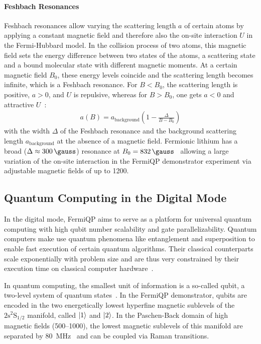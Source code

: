 \paragraph*{Feshbach Resonances} Feshbach resonances allow varying the scattering length $a$ of certain atoms by applying a constant magnetic field and therefore also the on-site interaction $U$ in the Fermi-Hubbard model. In the collision process of two atoms, this magnetic field sets the energy difference between two states of the atoms, a scattering state and a bound molecular state with different magnetic moments. At a certain magnetic field $B_0$, these energy levels coincide and the scattering length becomes infinite, which is a Feshbach resonance. For $B < B_0$, the scattering length is positive, $a > 0$, and $U$ is repulsive, whereas for $B > B_0$, one gets $a < 0$ and attractive $U$~\cite{chin_feshbach_2010}:
\begin{align}
    a(B) = a_\text{background} \left(1 - \frac{\Delta}{B-B_0}\right)
\end{align}
with the width $\Delta$ of the Feshbach resonance and the background scattering length $a_\text{background}$ at the absence of a magnetic field. Fermionic lithium has a broad ($\Delta \approx \SI[]{300}{\gauss}$) resonance at $B_0 = \SI[]{832}{\gauss}$~\cite{zurn_precise_2013} allowing a large variation of the on-site interaction in the FermiQP demonstrator experiment via adjustable magnetic fields of up to \SI[]{1200}{\gauss}.

\subsection*{Quantum Computing in the Digital Mode}\label{ch:digital_mode}
In the digital mode, FermiQP aims to serve as a platform for universal quantum computing with high qubit number scalability and gate parallelizability. Quantum computers make use quantum phenomena like entanglement and superposition to enable fast execution of certain quantum algorithms. Their classical counterparts scale exponentially with problem size and are thus very constrained by their execution time on classical computer hardware~\cite{nielsen_quantum_2010, hidary_quantum_2021, ladd_quantum_2010, mainzer_quantencomputer_2020}.

In quantum computing, the smallest unit of information is a so-called qubit, a two-level system of quantum states~\cite{nielsen_quantum_2010, hidary_quantum_2021, ladd_quantum_2010, mainzer_quantencomputer_2020}. In the FermiQP demonstrator, qubits are encoded in the two energetically lowest hyperfine magnetic sublevels of the $2\text{s}^2\text{S}_{1/2}$ manifold, called $\Ket{1}$ and $\Ket{2}$. In the Paschen-Back domain of high magnetic fields (\SIrange[]{500}{1000}{\gauss}), the lowest magnetic sublevels of this manifold are separated by \SI[]{80}{\mega\hertz}~\cite{gehm_properties_2003,wei_magnetic-field_2013} and can be coupled via Raman transitions.

